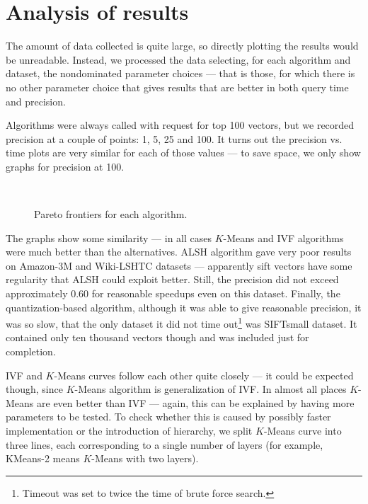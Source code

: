 \section{Analysis of results}

The amount of data collected is quite large, so directly plotting the results would be
unreadable. Instead, we processed the data selecting, for each algorithm and dataset,
the nondominated parameter choices --- that is those, for which there is no other
parameter choice that gives results that are better in both query time and precision.

Algorithms were always called with request for top 100 vectors, but we recorded
precision at a couple of points: 1, 5, 25 and 100. It turns out the precision vs. time
plots are very similar for each of those values --- to save space, we only show
graphs for precision at 100.

\begin{figure}
	\centering
	\\
\caption{Pareto frontiers for each algorithm.}
\end{figure}

The graphs show some similarity --- in all cases $K$-Means and IVF algorithms were much better
than the alternatives. ALSH algorithm gave very poor results on Amazon-3M and Wiki-LSHTC
datasets --- apparently sift vectors have some regularity that ALSH could exploit better.
Still, the precision did not exceed approximately $0.60$ for reasonable speedups even on
this dataset. Finally, the quantization-based algorithm, although it was able to give
reasonable precision, it was so slow, that the only dataset it did not time 
out\footnote{Timeout was set to twice the time of brute force search.}
was SIFTsmall dataset. It contained only ten thousand vectors though and was included
just for completion.

IVF and $K$-Means curves follow each other quite closely --- it could be expected though,
since $K$-Means algorithm is generalization of IVF. In almost all places $K$-Means are even
better than IVF --- again, this can be explained by having more parameters to be tested.
To check whether this is caused by possibly faster implementation or the introduction of
hierarchy, we split $K$-Means curve into three lines, each corresponding to a single
number of layers (for example, KMeans-2 means $K$-Means with two layers).

